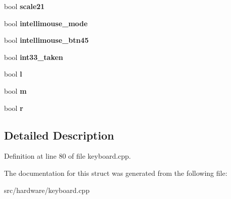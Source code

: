 \begin{DoxyCompactItemize}
\item 
\hypertarget{structps2mouse_ab6d41806329d94ccd788853e8b6f36f3}{bool {\bfseries scale21}}\label{structps2mouse_ab6d41806329d94ccd788853e8b6f36f3}

\item 
\hypertarget{structps2mouse_afbc6ac0efb4991a79f66e5e5e2a89b19}{bool {\bfseries intellimouse\-\_\-mode}}\label{structps2mouse_afbc6ac0efb4991a79f66e5e5e2a89b19}

\item 
\hypertarget{structps2mouse_aa2d43c441bced55d4aa4bf18f42a3fb9}{bool {\bfseries intellimouse\-\_\-btn45}}\label{structps2mouse_aa2d43c441bced55d4aa4bf18f42a3fb9}

\item 
\hypertarget{structps2mouse_a24804c088c3b53b0e5425819a844cffc}{bool {\bfseries int33\-\_\-taken}}\label{structps2mouse_a24804c088c3b53b0e5425819a844cffc}

\item 
\hypertarget{structps2mouse_ad012940ddb2e6e826edc420d5cdc9871}{bool {\bfseries l}}\label{structps2mouse_ad012940ddb2e6e826edc420d5cdc9871}

\item 
\hypertarget{structps2mouse_ad94f7a068aab0cef083a02033d8c2671}{bool {\bfseries m}}\label{structps2mouse_ad94f7a068aab0cef083a02033d8c2671}

\item 
\hypertarget{structps2mouse_a38da8cabd941a1a374da3b35ef90ff35}{bool {\bfseries r}}\label{structps2mouse_a38da8cabd941a1a374da3b35ef90ff35}

\end{DoxyCompactItemize}


\subsection{Detailed Description}


Definition at line 80 of file keyboard.\-cpp.



The documentation for this struct was generated from the following file\-:\begin{DoxyCompactItemize}
\item 
src/hardware/keyboard.\-cpp\end{DoxyCompactItemize}
